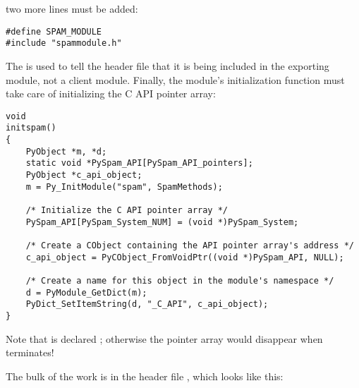 \documentclass{manual}
\begin{document}
two more lines must be added:

\begin{verbatim}
#define SPAM_MODULE
#include "spammodule.h"
\end{verbatim}

The  is used to tell the header file that it is being
included in the exporting module, not a client module. Finally,
the module's initialization function must take care of initializing
the C API pointer array:

\begin{verbatim}
void
initspam()
{
    PyObject *m, *d;
    static void *PySpam_API[PySpam_API_pointers];
    PyObject *c_api_object;
    m = Py_InitModule("spam", SpamMethods);

    /* Initialize the C API pointer array */
    PySpam_API[PySpam_System_NUM] = (void *)PySpam_System;

    /* Create a CObject containing the API pointer array's address */
    c_api_object = PyCObject_FromVoidPtr((void *)PySpam_API, NULL);

    /* Create a name for this object in the module's namespace */
    d = PyModule_GetDict(m);
    PyDict_SetItemString(d, "_C_API", c_api_object);
}
\end{verbatim}

Note that  is declared ; otherwise
the pointer array would disappear when  terminates!

The bulk of the work is in the header file ,
which looks like this:
\end{document}
